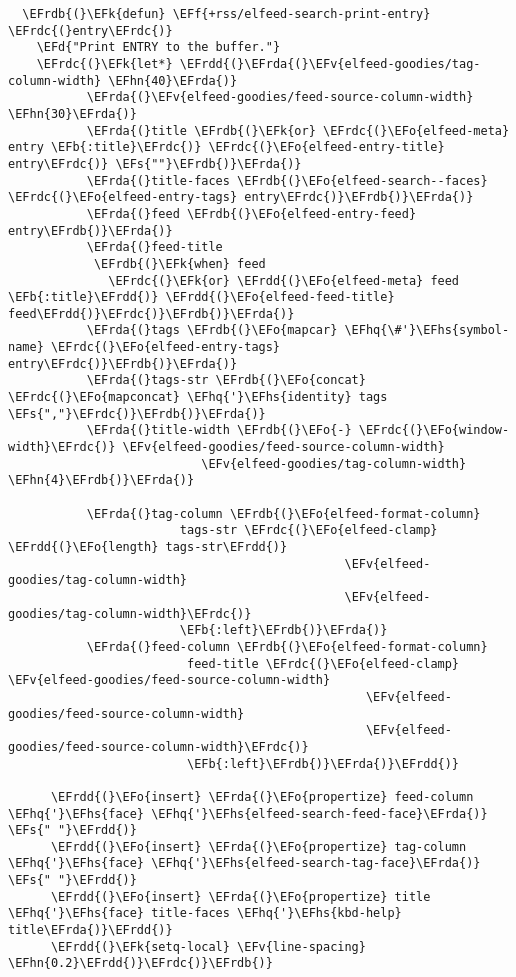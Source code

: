 \documentclass[c]{article}
\theoremstyle{plain}%
\theoremstyle{definition}
\theoremstyle{remark}
\newcommand{\EFs}[1]{\textcolor{EFs}{#1}} %
\newcommand{\EFd}[1]{\textcolor{EFd}{#1}} %
\newcommand{\EFk}[1]{\textcolor{EFk}{#1}} %
\newcommand{\EFb}[1]{\textcolor{EFb}{#1}} %
\newcommand{\EFf}[1]{\textcolor{EFf}{#1}} %
\newcommand{\EFv}[1]{\textcolor{EFv}{#1}} %
\newcommand{\EFo}[1]{\textcolor{EFo}{#1}} %
\newcommand{\EFhn}[1]{\textcolor{EFhn}{\textbf{#1}}} %
\newcommand{\EFhq}[1]{\textcolor{EFhq}{#1}} %
\newcommand{\EFhs}[1]{\textcolor{EFhs}{#1}} %
\newcommand{\EFrda}[1]{\textcolor{EFrda}{#1}} %
\newcommand{\EFrdb}[1]{\textcolor{EFrdb}{#1}} %
\newcommand{\EFrdc}[1]{\textcolor{EFrdc}{#1}} %
\newcommand{\EFrdd}[1]{\textcolor{EFrdd}{#1}} %
\begin{document}
\begin{Code}
\begin{Verbatim}
  \EFrdb{(}\EFk{defun} \EFf{+rss/elfeed-search-print-entry} \EFrdc{(}entry\EFrdc{)}
    \EFd{"Print ENTRY to the buffer."}
    \EFrdc{(}\EFk{let*} \EFrdd{(}\EFrda{(}\EFv{elfeed-goodies/tag-column-width} \EFhn{40}\EFrda{)}
           \EFrda{(}\EFv{elfeed-goodies/feed-source-column-width} \EFhn{30}\EFrda{)}
           \EFrda{(}title \EFrdb{(}\EFk{or} \EFrdc{(}\EFo{elfeed-meta} entry \EFb{:title}\EFrdc{)} \EFrdc{(}\EFo{elfeed-entry-title} entry\EFrdc{)} \EFs{""}\EFrdb{)}\EFrda{)}
           \EFrda{(}title-faces \EFrdb{(}\EFo{elfeed-search--faces} \EFrdc{(}\EFo{elfeed-entry-tags} entry\EFrdc{)}\EFrdb{)}\EFrda{)}
           \EFrda{(}feed \EFrdb{(}\EFo{elfeed-entry-feed} entry\EFrdb{)}\EFrda{)}
           \EFrda{(}feed-title
            \EFrdb{(}\EFk{when} feed
              \EFrdc{(}\EFk{or} \EFrdd{(}\EFo{elfeed-meta} feed \EFb{:title}\EFrdd{)} \EFrdd{(}\EFo{elfeed-feed-title} feed\EFrdd{)}\EFrdc{)}\EFrdb{)}\EFrda{)}
           \EFrda{(}tags \EFrdb{(}\EFo{mapcar} \EFhq{\#'}\EFhs{symbol-name} \EFrdc{(}\EFo{elfeed-entry-tags} entry\EFrdc{)}\EFrdb{)}\EFrda{)}
           \EFrda{(}tags-str \EFrdb{(}\EFo{concat} \EFrdc{(}\EFo{mapconcat} \EFhq{'}\EFhs{identity} tags \EFs{","}\EFrdc{)}\EFrdb{)}\EFrda{)}
           \EFrda{(}title-width \EFrdb{(}\EFo{-} \EFrdc{(}\EFo{window-width}\EFrdc{)} \EFv{elfeed-goodies/feed-source-column-width}
                           \EFv{elfeed-goodies/tag-column-width} \EFhn{4}\EFrdb{)}\EFrda{)}

           \EFrda{(}tag-column \EFrdb{(}\EFo{elfeed-format-column}
                        tags-str \EFrdc{(}\EFo{elfeed-clamp} \EFrdd{(}\EFo{length} tags-str\EFrdd{)}
                                               \EFv{elfeed-goodies/tag-column-width}
                                               \EFv{elfeed-goodies/tag-column-width}\EFrdc{)}
                        \EFb{:left}\EFrdb{)}\EFrda{)}
           \EFrda{(}feed-column \EFrdb{(}\EFo{elfeed-format-column}
                         feed-title \EFrdc{(}\EFo{elfeed-clamp} \EFv{elfeed-goodies/feed-source-column-width}
                                                  \EFv{elfeed-goodies/feed-source-column-width}
                                                  \EFv{elfeed-goodies/feed-source-column-width}\EFrdc{)}
                         \EFb{:left}\EFrdb{)}\EFrda{)}\EFrdd{)}

      \EFrdd{(}\EFo{insert} \EFrda{(}\EFo{propertize} feed-column \EFhq{'}\EFhs{face} \EFhq{'}\EFhs{elfeed-search-feed-face}\EFrda{)} \EFs{" "}\EFrdd{)}
      \EFrdd{(}\EFo{insert} \EFrda{(}\EFo{propertize} tag-column \EFhq{'}\EFhs{face} \EFhq{'}\EFhs{elfeed-search-tag-face}\EFrda{)} \EFs{" "}\EFrdd{)}
      \EFrdd{(}\EFo{insert} \EFrda{(}\EFo{propertize} title \EFhq{'}\EFhs{face} title-faces \EFhq{'}\EFhs{kbd-help} title\EFrda{)}\EFrdd{)}
      \EFrdd{(}\EFk{setq-local} \EFv{line-spacing} \EFhn{0.2}\EFrdd{)}\EFrdc{)}\EFrdb{)}


\end{Verbatim}
\end{Code}
\end{document}
